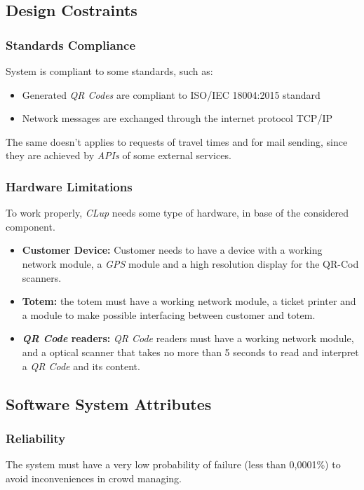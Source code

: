 \documentclass{article}
\begin{document}
	\newpage
	
	\subsection{Design Costraints}
		\subsubsection{Standards Compliance}
	System is compliant to some standards, such as:
	\begin{itemize}
		\item Generated \emph{QR Codes} are compliant to ISO/IEC 18004:2015 standard
		\item Network messages are exchanged through the internet protocol TCP/IP
	\end{itemize}
The same doesn't applies to requests of travel times and for mail sending, since they are achieved by \emph{APIs} of some external services.
		\subsubsection{Hardware Limitations}
		To work properly, \emph{CLup} needs some type of hardware, in base of the considered component.
		\begin{itemize}
			\item {\bfseries Customer Device:} Customer needs to have a device with a working network module, a \emph{GPS} module and a high resolution display for the QR-Cod scanners.
			\item {\bfseries Totem:} the totem must have a working network module, a ticket printer and a module to make possible interfacing between customer and totem.
			\item {\bfseries \emph{QR Code} readers:} \emph{QR Code} readers must have a working network module, and a optical scanner that takes no more than 5 seconds to read and interpret a \emph{QR Code} and its content.
		\end{itemize}
	
	\subsection{Software System Attributes}
		\subsubsection{Reliability}
		The system must have a  very low probability of failure (less than 0,0001\%) to avoid inconveniences in crowd managing.
\end{document}
